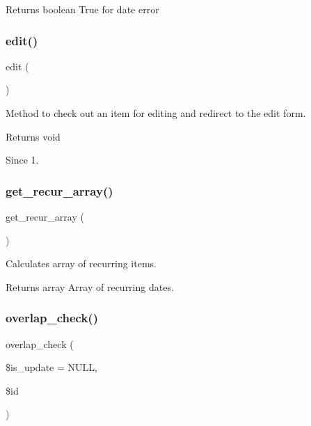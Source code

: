 \begin{DoxyReturn}{Returns}
boolean True for date error 
\end{DoxyReturn}
\mbox{\label{classtks__agenda_controller_item_form_a5cb75cbb16467eb1768837d126dc535b}} 
\subsubsection{edit()}
{\footnotesize\ttfamily edit (\begin{DoxyParamCaption}{ }\end{DoxyParamCaption})}

Method to check out an item for editing and redirect to the edit form.

\begin{DoxyReturn}{Returns}
void
\end{DoxyReturn}
\begin{DoxySince}{Since}
1. 
\end{DoxySince}
\mbox{\label{classtks__agenda_controller_item_form_ac086a8828032c61e6c139c4a79d47b9b}} 
\subsubsection{get\+\_\+recur\+\_\+array()}
{\footnotesize\ttfamily get\+\_\+recur\+\_\+array (\begin{DoxyParamCaption}{ }\end{DoxyParamCaption})}

Calculates array of recurring items.

\begin{DoxyReturn}{Returns}
array Array of recurring dates. 
\end{DoxyReturn}
\mbox{\label{classtks__agenda_controller_item_form_a807b8804650cdfcf25c1b7d03bdd530f}} 
\subsubsection{overlap\+\_\+check()}
{\footnotesize\ttfamily overlap\+\_\+check (\begin{DoxyParamCaption}\item[{}]{\$is\+\_\+update = {\ttfamily NULL},  }\item[{}]{\$id }\end{DoxyParamCaption})}

